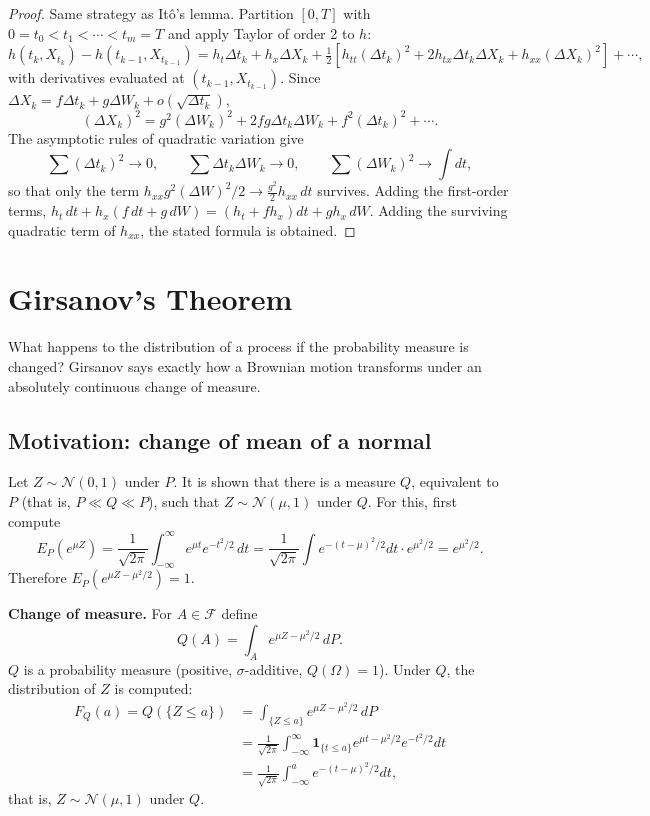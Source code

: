 \documentclass[11pt, a4paper]{article}
\begin{document}
\begin{proof}
Same strategy as Itô's lemma. Partition $[0, T]$ with $0 = t_0 < t_1 < \cdots < t_m =
T$ and apply Taylor of order 2 to $h$:
$$ h(t_k, X_{t_k}) - h(t_{k-1}, X_{t_{k-1}}) = h_t \Delta t_k + h_x \Delta X_k + \tfrac{1}{2}
[h_{tt} (\Delta t_k)^2 + 2 h_{tx} \Delta t_k \Delta X_k + h_{xx} (\Delta X_k)^2] + \cdots, $$
with derivatives evaluated at $(t_{k-1}, X_{t_{k-1}})$. Since $\Delta X_k = f \Delta t_k + g \Delta W_k
+ o(\sqrt{\Delta t_k})$,
$$ (\Delta X_k)^2 = g^2 (\Delta W_k)^2 + 2 f g \Delta t_k \Delta W_k + f^2 (\Delta t_k)^2 +
\cdots. $$
The asymptotic rules of quadratic variation give
$$ \sum (\Delta t_k)^2 \to 0, \qquad \sum \Delta t_k \Delta W_k \to 0, \qquad \sum (\Delta W_k)^2
\to \int dt, $$
so that only the term $h_{xx} g^2 (\Delta W)^2 / 2 \to \tfrac{g^2}{2} h_{xx} \, dt$ survives.
Adding the first-order terms, $h_t \, dt + h_x (f \, dt + g \, dW) = (h_t + f h_x) dt + g h_x
\, dW$. Adding the surviving quadratic term of $h_{xx}$, the stated formula
is obtained.
\end{proof}

\newpage

\section{Girsanov's Theorem}

What happens to the distribution of a process if the probability measure is changed?
Girsanov says exactly how a Brownian motion transforms under an absolutely continuous
change of measure.

\subsection{Motivation: change of mean of a normal}

Let $Z \sim \mathcal{N}(0, 1)$ under $P$. It is shown that there is a measure $Q$, equivalent to $P$ (that
is, $P \ll Q \ll P$), such that $Z \sim \mathcal{N}(\mu, 1)$ under $Q$. For this, first compute
$$ E_P(e^{\mu Z}) = \frac{1}{\sqrt{2\pi}} \int_{-\infty}^\infty e^{\mu t} e^{-t^2/2} \, dt =
\frac{1}{\sqrt{2\pi}} \int e^{-(t-\mu)^2/2} dt \cdot e^{\mu^2/2} = e^{\mu^2/2}. $$
Therefore $E_P(e^{\mu Z - \mu^2/2}) = 1$.

\textbf{Change of measure.} For $A \in \mathcal{F}$ define
$$ Q(A) = \int_A e^{\mu Z - \mu^2/2} \, dP. $$
$Q$ is a probability measure (positive, $\sigma$-additive, $Q(\Omega) = 1$). Under $Q$,
the distribution of $Z$ is computed:
\begin{align*}
F_Q(a) = Q(\{Z \le a\}) &= \int_{\{Z \le a\}} e^{\mu Z - \mu^2/2} \, dP \\
&= \frac{1}{\sqrt{2\pi}} \int_{-\infty}^\infty \mathbf{1}_{\{t \le a\}} e^{\mu t - \mu^2/2}
e^{-t^2/2} dt \\
&= \frac{1}{\sqrt{2\pi}} \int_{-\infty}^a e^{-(t - \mu)^2/2} dt,
\end{align*}
that is, $Z \sim \mathcal{N}(\mu, 1)$ under $Q$.
\end{document}
